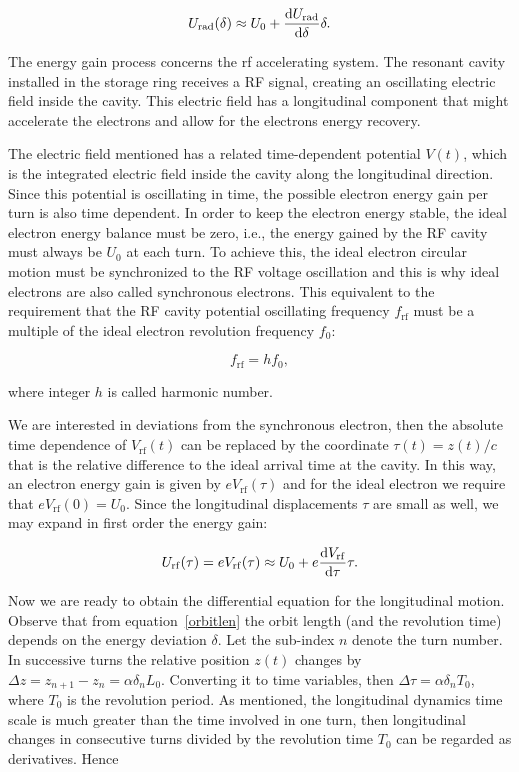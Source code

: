 \begin{equation}
    U_{\mathrm{rad}}(\delta) \approx U_0 + \dfrac{\mathrm{d} U_{\mathrm{rad}}}{\mathrm{d} \delta}\delta.
    \label{approx1}
\end{equation}

The energy gain process concerns the \gls{rf} accelerating system. The resonant cavity installed in the storage ring receives a RF signal, creating an oscillating electric field inside the cavity. This electric field has a longitudinal component that might accelerate the electrons and allow for the electrons energy recovery.

The electric field mentioned has a related time-dependent potential $V(t)$, which is the integrated electric field inside the cavity along the longitudinal direction. Since this potential is oscillating in time, the possible electron energy gain per turn is also time dependent. In order to keep the electron energy stable, the ideal electron energy balance must be zero, i.e., the energy gained by the RF cavity must always be $U_0$ at each turn. To achieve this, the ideal electron circular motion must be synchronized to the RF voltage oscillation and this is why ideal electrons are also called synchronous electrons. This equivalent to the requirement that the RF cavity potential oscillating frequency $f_{\mathrm{rf}}$ must be a multiple of the ideal electron revolution frequency $f_0$:

\begin{equation}
    f_{\mathrm{rf}} = h f_0,
\end{equation}

where integer $h$ is called harmonic number.

We are interested in deviations from the synchronous electron, then the absolute time dependence of $V_{\mathrm{rf}}(t)$ can be replaced by the coordinate $\tau(t) = z(t)/c$ that is the relative difference to the ideal arrival time at the cavity. In this way, an electron energy gain is given by $eV_{\mathrm{rf}}(\tau)$ and for the ideal electron we require that $eV_{\mathrm{rf}}(0) = U_0$. Since the  longitudinal displacements $\tau$ are small as well, we may expand in first order the energy gain:

\begin{equation}
    U_{\mathrm{rf}}(\tau) = eV_{\mathrm{rf}}(\tau) \approx U_0 + e\dfrac{\mathrm{d} V_{\mathrm{rf}}}{\mathrm{d} \tau}\tau.
    \label{approx2}
\end{equation}

Now we are ready to obtain the differential equation for the longitudinal motion. Observe that from equation~\eqref{orbitlen} the orbit length (and the revolution time) depends on the energy deviation $\delta$. Let the sub-index $n$ denote the turn number. In successive turns the relative position $z(t)$ changes by $\Delta z = z_{n+1} - z_n = \alpha\delta_n L_0$. Converting it to time variables, then $\Delta \tau = \alpha \delta_n T_0$, where $T_0$ is the revolution period. As mentioned, the longitudinal dynamics time scale is much greater than the time involved in one turn, then longitudinal changes in consecutive turns divided by the revolution time $T_0$ can be regarded as derivatives. Hence

